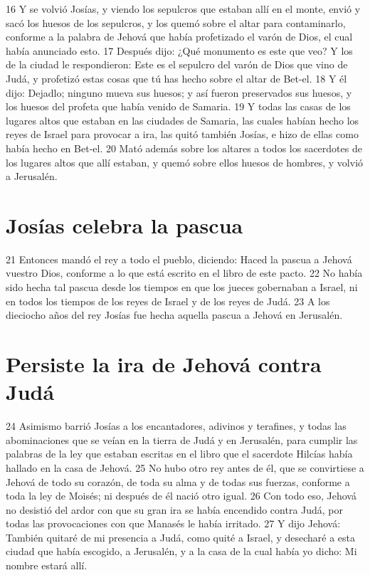 16 Y se volvió Josías, y viendo los sepulcros que estaban allí en el monte, envió y sacó los huesos de los sepulcros, y los quemó sobre el altar para contaminarlo, conforme a la palabra de Jehová que había profetizado el varón de Dios, el cual había anunciado esto. 
17 Después dijo: ¿Qué monumento es este que veo? Y los de la ciudad le respondieron: Este es el sepulcro del varón de Dios que vino de Judá, y profetizó estas cosas que tú has hecho sobre el altar de Bet-el. 
18 Y él dijo: Dejadlo; ninguno mueva sus huesos; y así fueron preservados sus huesos, y los huesos del profeta que había venido de Samaria.
19 Y todas las casas de los lugares altos que estaban en las ciudades de Samaria, las cuales habían hecho los reyes de Israel para provocar a ira, las quitó también Josías, e hizo de ellas como había hecho en Bet-el.
20 Mató además sobre los altares a todos los sacerdotes de los lugares altos que allí estaban, y quemó sobre ellos huesos de hombres, y volvió a Jerusalén.

\section*{Josías celebra la pascua}

21 Entonces mandó el rey a todo el pueblo, diciendo: Haced la pascua a Jehová vuestro Dios, conforme a lo que está escrito en el libro de este pacto.
22 No había sido hecha tal pascua desde los tiempos en que los jueces gobernaban a Israel, ni en todos los tiempos de los reyes de Israel y de los reyes de Judá.
23 A los dieciocho años del rey Josías fue hecha aquella pascua a Jehová en Jerusalén.

\section*{Persiste la ira de Jehová contra Judá}

24 Asimismo barrió Josías a los encantadores, adivinos y terafines, y todas las abominaciones que se veían en la tierra de Judá y en Jerusalén, para cumplir las palabras de la ley que estaban escritas en el libro que el sacerdote Hilcías había hallado en la casa de Jehová.
25 No hubo otro rey antes de él, que se convirtiese a Jehová de todo su corazón, de toda su alma y de todas sus fuerzas, conforme a toda la ley de Moisés; ni después de él nació otro igual.
26 Con todo eso, Jehová no desistió del ardor con que su gran ira se había encendido contra Judá, por todas las provocaciones con que Manasés le había irritado.
27 Y dijo Jehová: También quitaré de mi presencia a Judá, como quité a Israel, y desecharé a esta ciudad que había escogido, a Jerusalén, y a la casa de la cual había yo dicho: Mi nombre estará allí.


